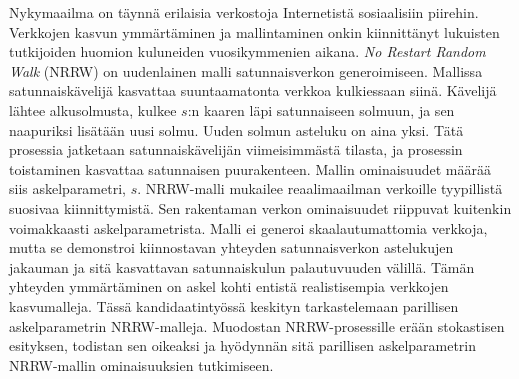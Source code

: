 \documentclass[finnish, 12pt, a4paper, sci, utf8, pdfa]{aaltothesis}
\date{1.5.2018}
\begin{document}
	
\makecoverpage

\makecopyrightpage

\begin{abstractpage}[finnish]
Nykymaailma on täynnä erilaisia verkostoja Internetistä sosiaalisiin piirehin. Verkkojen kasvun ymmärtäminen ja mallintaminen
onkin kiinnittänyt lukuisten tutkijoiden huomion kuluneiden vuosikymmenien aikana.
\textit{No Restart Random Walk} (NRRW) on uudenlainen malli satunnaisverkon generoimiseen. Mallissa satunnaiskävelijä kasvattaa suuntaamatonta verkkoa 
kulkiessaan siinä. Kävelijä lähtee alkusolmusta, kulkee $ s $:n kaaren läpi satunnaiseen solmuun, ja sen naapuriksi lisätään 
uusi solmu. Uuden solmun asteluku on aina yksi. Tätä prosessia jatketaan satunnaiskävelijän viimeisimmästä tilasta, ja prosessin 
toistaminen kasvattaa satunnaisen puurakenteen. Mallin ominaisuudet määrää siis askelparametri, $ s $. 
NRRW-malli mukailee reaalimaailman verkoille tyypillistä suosivaa kiinnittymistä. Sen rakentaman verkon ominaisuudet riippuvat 
kuitenkin voimakkaasti askelparametrista. Malli ei generoi skaalautumattomia verkkoja, mutta se demonstroi kiinnostavan yhteyden 
satunnaisverkon astelukujen jakauman ja sitä kasvattavan satunnaiskulun palautuvuuden välillä. Tämän yhteyden ymmärtäminen on askel 
kohti entistä realistisempia verkkojen kasvumalleja. Tässä kandidaatintyössä keskityn tarkastelemaan parillisen askelparametrin 
NRRW-malleja. Muodostan NRRW-prosessille erään stokastisen esityksen, todistan sen oikeaksi ja hyödynnän sitä parillisen askelparametrin 
NRRW-mallin ominaisuuksien tutkimiseen.
\end{abstractpage}

\end{document}
